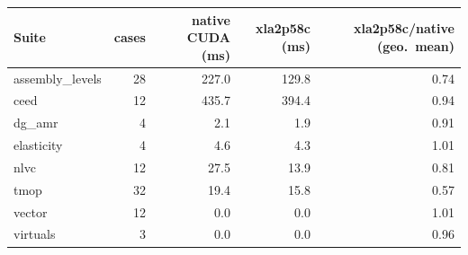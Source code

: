 \begin{tabular}{l r r r r}
\toprule
Suite & cases & native CUDA (ms) & xla2p58c (ms) & xla2p58c/native (geo.\ mean) \\
\midrule
assembly_levels & 28 & 227.0 & 129.8 & 0.74 \\
ceed & 12 & 435.7 & 394.4 & 0.94 \\
dg_amr & 4 & 2.1 & 1.9 & 0.91 \\
elasticity & 4 & 4.6 & 4.3 & 1.01 \\
nlvc & 12 & 27.5 & 13.9 & 0.81 \\
tmop & 32 & 19.4 & 15.8 & 0.57 \\
vector & 12 & 0.0 & 0.0 & 1.01 \\
virtuals & 3 & 0.0 & 0.0 & 0.96 \\
\bottomrule
\end{tabular}
